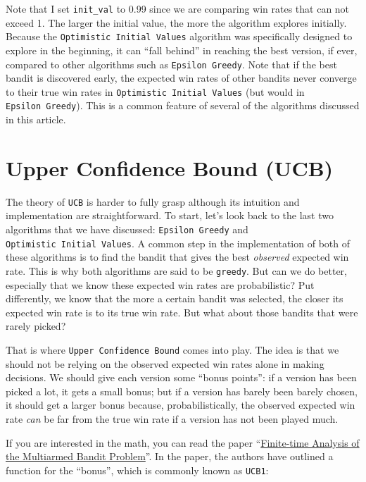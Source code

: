 \documentclass[
]{book}
\theoremstyle{definition}
\theoremstyle{definition}
\theoremstyle{definition}
\theoremstyle{definition}
\theoremstyle{remark}
\begin{document}
Note that I set \texttt{init\_val} to 0.99 since we are comparing win rates that can not exceed 1. The larger the initial value, the more the algorithm explores initially. Because the \texttt{Optimistic\ Initial\ Values} algorithm was specifically designed to explore in the beginning, it can ``fall behind'' in reaching the best version, if ever, compared to other algorithms such as \texttt{Epsilon\ Greedy}. Note that if the best bandit is discovered early, the expected win rates of other bandits never converge to their true win rates in \texttt{Optimistic\ Initial\ Values} (but would in \texttt{Epsilon\ Greedy}). This is a common feature of several of the algorithms discussed in this article.

\hypertarget{upper-confidence-bound-ucb}{%
\section{Upper Confidence Bound (UCB)}\label{upper-confidence-bound-ucb}}

The theory of \texttt{UCB} is harder to fully grasp although its intuition and implementation are straightforward. To start, let's look back to the last two algorithms that we have discussed: \texttt{Epsilon\ Greedy} and \texttt{Optimistic\ Initial\ Values}. A common step in the implementation of both of these algorithms is to find the bandit that gives the best \emph{observed} expected win rate. This is why both algorithms are said to be \texttt{greedy}. But can we do better, especially that we know these expected win rates are probabilistic? Put differently, we know that the more a certain bandit was selected, the closer its expected win rate is to its true win rate. But what about those bandits that were rarely picked?

That is where \texttt{Upper\ Confidence\ Bound} comes into play. The idea is that we should not be relying on the observed expected win rates alone in making decisions. We should give each version some ``bonus points'': if a version has been picked a lot, it gets a small bonus; but if a version has barely been barely chosen, it should get a larger bonus because, probabilistically, the observed expected win rate \emph{can} be far from the true win rate if a version has not been played much.

If you are interested in the math, you can read the paper ``\href{https://homes.di.unimi.it/~cesabian/Pubblicazioni/ml-02.pdf}{Finite-time Analysis of the Multiarmed Bandit Problem}''. In the paper, the authors have outlined a function for the ``bonus'', which is commonly known as \texttt{UCB1}:
\end{document}
